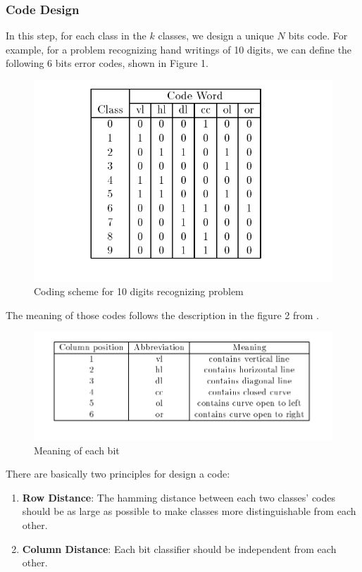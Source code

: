\subsubsection*{Code Design}

In this step, for each class in the $k$ classes, we design a unique $N$ bits code. For example, for a problem recognizing hand writings of 10 digits, we can define the following 6 bits error codes, shown in Figure 1.

\begin{figure}[!htbp]
\centering
\includegraphics[bb=0 0 680 500,scale=.3]{FIG/code.png}
\caption{Coding scheme for 10 digits recognizing problem}
\end{figure}

The meaning of those codes follows the description in the figure 2 from \cite{Thomas1995}.


\begin{figure}[!htbp]
\centering
\includegraphics[bb=0 0 860 300,scale=.3]{FIG/meaning.png}
\caption{Meaning of each bit}
\end{figure}

There are basically two principles for design a code\cite{Thomas1995}:
\begin{enumerate}
    \item \textbf{Row Distance}: The hamming distance between each two classes' codes should be as large as possible to make classes more distinguishable from each other.
    \item \textbf{Column Distance}: Each bit classifier should be independent from each other.
\end{enumerate}

